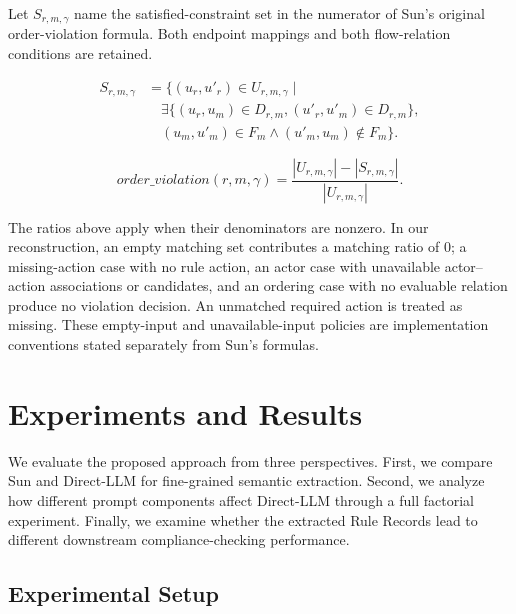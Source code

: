 \documentclass[conference]{IEEEtran}
\begin{document}
Let \(S_{r,m,\gamma}\) name the satisfied-constraint set in the numerator of Sun's original order-violation formula. Both endpoint mappings and both flow-relation conditions are retained.

\begin{equation}
\begin{aligned}
S_{r,m,\gamma}
&=\bigl\{(u_r,u'_r)\in U_{r,m,\gamma}\mid\\
&\quad\exists\bigl\{(u_r,u_m)\in D_{r,m},
  (u'_r,u'_m)\in D_{r,m}\bigr\},\\
&\quad(u_m,u'_m)\in F_m
  \land(u'_m,u_m)\notin F_m\bigr\}.
\end{aligned}
\label{eq:order_satisfied}
\end{equation}

\begin{equation}
\mathit{order\_violation}(r,m,\gamma)
=\frac{|U_{r,m,\gamma}|-|S_{r,m,\gamma}|}{|U_{r,m,\gamma}|}.
\label{eq:order}
\end{equation}

The ratios above apply when their denominators are nonzero. In our reconstruction, an empty matching set contributes a matching ratio of \(0\); a missing-action case with no rule action, an actor case with unavailable actor--action associations or candidates, and an ordering case with no evaluable relation produce no violation decision. An unmatched required action is treated as missing. These empty-input and unavailable-input policies are implementation conventions stated separately from Sun's formulas.


\section{Experiments and Results}
\label{sec:5}

We evaluate the proposed approach from three perspectives. First, we compare Sun and Direct-LLM for fine-grained semantic extraction. Second, we analyze how different prompt components affect Direct-LLM through a full factorial experiment. Finally, we examine whether the extracted Rule Records lead to different downstream compliance-checking performance.

\subsection{Experimental Setup}
\label{sec:5.1}
\end{document}
